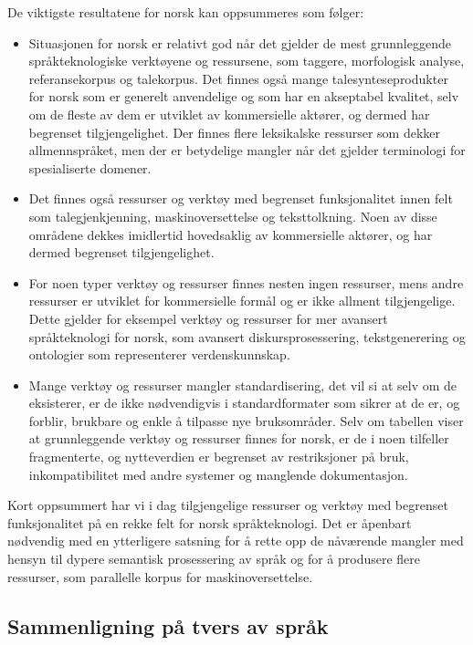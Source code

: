 \begin{multicols}{2}
De viktigste resultatene for norsk kan oppsummeres som følger: 

\begin{itemize}
\item Situasjonen for norsk er relativt god når det gjelder de mest grunnleggende språkteknologiske verktøyene og ressursene, som taggere, morfologisk analyse, referansekorpus og talekorpus.
Det finnes også mange talesynteseprodukter for norsk som er generelt anvendelige og som har en akseptabel kvalitet, selv om de fleste av dem er utviklet av kommersielle aktører, og dermed har begrenset tilgjengelighet. Der finnes flere leksikalske ressurser som dekker allmennspråket, men der er betydelige mangler når det gjelder terminologi for spesialiserte domener.
\item Det finnes også ressurser og verktøy med begrenset funksjonalitet innen felt som talegjenkjenning, maskinoversettelse og teksttolkning. Noen av disse områdene dekkes imidlertid hovedsaklig av kommersielle aktører, og har dermed begrenset tilgjengelighet.
\item For noen typer verktøy og ressurser finnes nesten ingen ressurser, mens andre ressurser er utviklet for kommersielle formål og er ikke allment tilgjengelige. 
Dette gjelder for eksempel verktøy og ressurser for mer avansert språkteknologi for norsk, som avansert diskursprosessering, tekstgenerering og ontologier som representerer verdenskunnskap.
\item Mange verktøy og ressurser mangler standardisering, det vil si at selv om de eksisterer, er de ikke nødvendigvis i standardformater som sikrer at de er, og forblir, brukbare og enkle å tilpasse nye bruksområder.
Selv om tabellen viser at grunnleggende verktøy og ressurser finnes for norsk, er de i noen tilfeller fragmenterte, og nytteverdien er begrenset av restriksjoner på bruk, inkompatibilitet med andre systemer og manglende dokumentasjon. 
\end{itemize}

Kort oppsummert har vi i dag tilgjengelige ressurser og verktøy med begrenset funksjonalitet på en rekke felt for norsk språkteknologi.
Det er åpenbart nødvendig med en ytterligere satsning for å rette opp de nåværende mangler med hensyn til dypere semantisk prosessering av språk og for å produsere flere ressurser, som parallelle korpus for maskinoversettelse.

\subsection{Sammenligning på tvers av språk}



\end{multicols}

